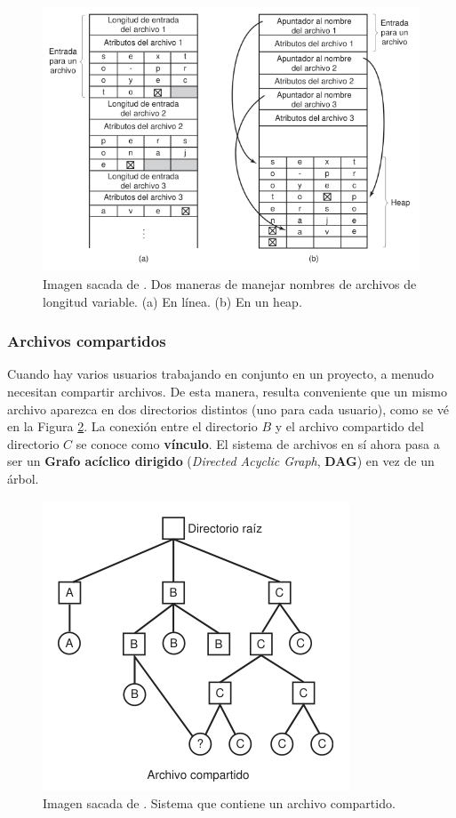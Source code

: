 \documentclass[12pt]{article}
\begin{document}
  \begin{figure}[H]
    \centering
    \includegraphics[width=0.9\linewidth]{imagenes/almac-nombres-archivos.png}
    \caption{Imagen sacada de \parencite{tanenbaum}. Dos maneras de manejar nombres de archivos de longitud variable. (a) En línea. (b) En un heap.}
    \label{fig:almac-nom-archivos}
  \end{figure}

  \subsubsection{Archivos compartidos}
  Cuando hay varios usuarios trabajando en conjunto en un proyecto, a menudo necesitan compartir archivos. De esta manera, resulta conveniente que un mismo archivo aparezca en dos directorios distintos (uno para cada usuario), como se vé en la Figura \ref{fig:archivo-compartido}. La conexión entre el directorio $ B $ y el archivo compartido del directorio $ C $ se conoce como \textbf{vínculo}. El sistema de archivos en sí ahora pasa a ser un \textbf{Grafo acíclico dirigido} (\textit{Directed Acyclic Graph}, \textbf{DAG}) en vez de un árbol.

  \begin{figure}[H]
    \centering
    \includegraphics[width=0.5\linewidth]{imagenes/archivo-compartido.png}
    \caption{Imagen sacada de \parencite{tanenbaum}. Sistema que contiene un archivo compartido.}
    \label{fig:archivo-compartido}
  \end{figure}
\end{document}
